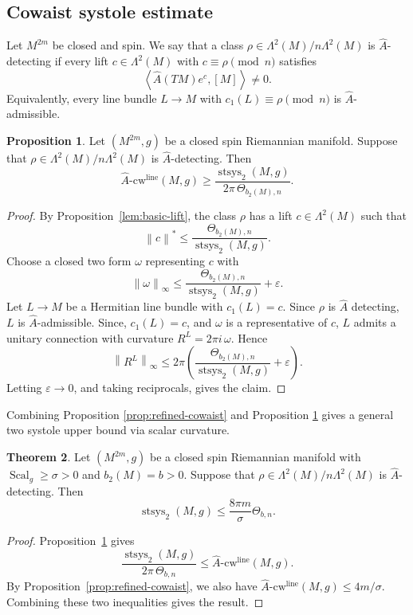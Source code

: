 \documentclass[11pt,reqno]{amsart}
\numberwithin{equation}{section}
\numberwithin{equation}{section}
\theoremstyle{definition}
\newtheorem{theorem}{Theorem}[section]
\newtheorem{proposition}[theorem]{Proposition}
\DeclareMathOperator{\Scal}{Scal}
\DeclareMathOperator{\stsys}{stsys}
\newcommand{\Ah}{\widehat A}
\newcommand{\Ahcwline}{\widehat A\text{-}\mathrm{cw}^{\mathrm{line}}}
\newcommand{\norm}[1]{\left\lVert #1\right\rVert}
\newcommand{\ip}[2]{\left\langle #1,#2\right\rangle}
\begin{document}
\subsection{Cowaist systole estimate} Let \(M^{2m}\) be closed and spin. We say that a class \(\rho\in \Lambda^2(M)/n\Lambda^2(M)\) is \(\Ah\)-detecting if every lift \(c\in \Lambda^2(M)\) with \(c\equiv\rho\pmod n\) satisfies
\[
\ip{\Ah(TM)e^c}{[M]}\neq0.
\]
Equivalently, every line bundle \(L\to M\) with \(c_1(L)\equiv\rho\pmod n\) is \(\Ah\)-admissible.

\begin{proposition}\label{prop:theta-cowaist-systole}
Let \((M^{2m},g)\) be a closed spin Riemannian manifold. Suppose that \(\rho\in \Lambda^2(M)/n\Lambda^2(M)\) is \(\Ah\)-detecting. Then
\[
\Ahcwline(M,g)
\ge
\frac{\stsys_2(M,g)}{2\pi\,\Theta_{b_2(M),n}}.
\]
\end{proposition}

\begin{proof}
By Proposition~\ref{lem:basic-lift}, the class \(\rho\) has a lift \(c\in \Lambda^2(M)\) such that
\[
\norm{c}^{\ast}
\le
\frac{\Theta_{b_2(M),n}}{\stsys_2(M,g)}.
\]
Choose a closed two form \(\omega\) representing \(c\) with
\[
\norm{\omega}_\infty
\le
\frac{\Theta_{b_2(M),n}}{\stsys_2(M,g)}+\varepsilon.
\]
Let \(L\to M\) be a Hermitian line bundle with \(c_1(L)=c\). Since \(\rho\) is \(\Ah\) detecting, \(L\) is \(\Ah\)-admissible. Since, $c_1(L)=c$, and $\omega$ is a representative of $c$, \(L\) admits a unitary connection with curvature \(R^L=2\pi i\,\omega\). Hence
\[
\norm{R^L}_\infty
\le
2\pi\left(
\frac{\Theta_{b_2(M),n}}{\stsys_2(M,g)}+\varepsilon
\right).
\]
Letting \(\varepsilon\to0\), and taking reciprocals, gives the claim.
\end{proof}

Combining Proposition \ref{prop:refined-cowaist} and Proposition \ref{prop:theta-cowaist-systole} gives a general two systole upper bound via scalar curvature. 
 
\begin{theorem}\label{cor:theta-scalar-general}
Let \((M^{2m},g)\) be a closed spin Riemannian manifold with \(\Scal_g \geq \sigma >0\) and $b_2(M)=b>0$. Suppose that \(\rho\in \Lambda^2(M)/n\Lambda^2(M)\) is \(\Ah\)-detecting. Then
\[
\stsys_2(M,g)
\le
\frac{8\pi m}{\sigma}\Theta_{b,n}.
\]
\end{theorem}

\begin{proof}
Proposition~\ref{prop:theta-cowaist-systole} gives
\[
\frac{\stsys_2(M,g)}{2\pi\,\Theta_{b,n}}
\le
\Ahcwline(M,g).
\]
By Proposition~\ref{prop:refined-cowaist}, we also have \(\Ahcwline(M,g)\le4m/\sigma\). Combining these two inequalities gives the result.
\end{proof}
\end{document}
